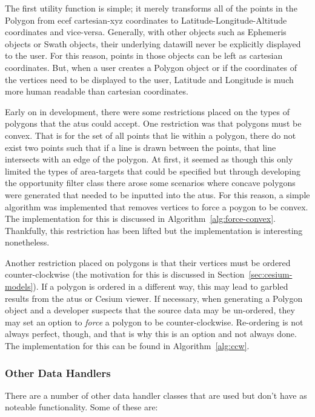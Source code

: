 The first utility function is simple; it merely transforms all of the points in
the Polygon from \acrfull{ecef} cartesian-xyz coordinates to
Latitude-Longitude-Altitude coordinates and vice-versa.  Generally, with other
objects such as Ephemeris objects or Swath objects, their underlying datawill
never be explicitly displayed to the user. For this reason, points in those
objects can be left as cartesian coordinates. But, when a user creates a
Polygon object or if the coordinates of the vertices need to be displayed to
the user, Latitude and Longitude is much more human readable than cartesian
coordinates. 

Early on in development, there were some restrictions placed on the types of
polygons that the \glspl{atu} could accept. One restriction was that polygons
must be convex. That is for the set of all points that lie within a polygon,
there do not exist two points such that if a line is drawn between the points,
that line intersects with an edge of the polygon. At first, it seemed as though
this only limited the types of area-targets that could be specified but through
developing the opportunity filter class there arose some scenarios where
concave polygons were generated that needed to be inputted into the
\glspl{atu}. For this reason, a simple algorithm was implemented that removes
vertices to force a poygon to be convex. The implementation for this is
discussed in Algorithm~\ref{alg:force-convex}. Thankfully, this restriction has
been lifted but the implementation is interesting nonetheless.

Another restriction placed on polygons is that their vertices must be ordered
counter-clockwise (the motivation for this is discussed in
Section~\ref{sec:cesium-models}). If a polygon is ordered in a different way,
this may lead to garbled results from the \glspl{atu} or Cesium viewer. If
necessary, when generating a Polygon object and a developer suspects that the
source data may be un-ordered, they may set an option to \textit{force} a
polygon to be counter-clockwise. Re-ordering is not always perfect, though, and
that is why this is an option and not always done. The implementation for this
can be found in Algorithm~\ref{alg:ccw}.


 

\subsubsection{Other Data Handlers}

There are a number of other data handler classes that are used but don't have
as noteable functionality. Some of these are:

